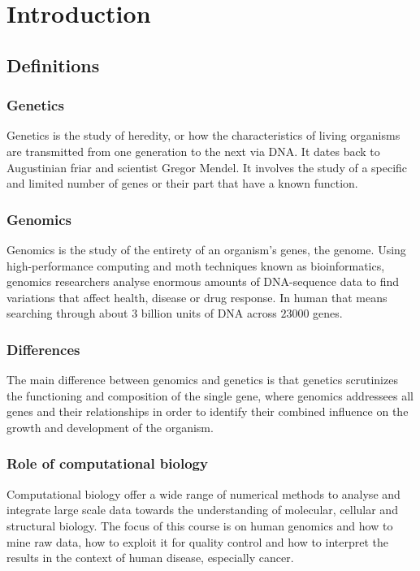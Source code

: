 \chapter{Introduction}

\section{Definitions}

	\subsection{Genetics}
	Genetics is the study of heredity, or how the characteristics of living organisms are transmitted from one generation to the next via DNA.
	It dates back to Augustinian friar and scientist Gregor Mendel.
	It involves the study of a specific and limited number of genes or their part that have a known function.

	\subsection{Genomics}
	Genomics is the study of the entirety of an organism's genes, the genome.
	Using high-performance computing and moth techniques known as bioinformatics, genomics researchers analyse enormous amounts of DNA-sequence data to find variations that affect health, disease or drug response.
	In human that means searching through about $3$ billion units of DNA across $23000$ genes.

	\subsection{Differences}
	The main difference between genomics and genetics is that genetics scrutinizes the functioning and composition of the single gene, where genomics addressees all genes and their relationships in order to identify their combined influence on the growth and development of the organism.

	\subsection{Role of computational biology}
	Computational biology offer a wide range of numerical methods to analyse and integrate large scale data towards the understanding of molecular, cellular and structural biology.
	The focus of this course is on human genomics and how to mine raw data, how to exploit it for quality control and how to interpret the results in the context of human disease, especially cancer.


